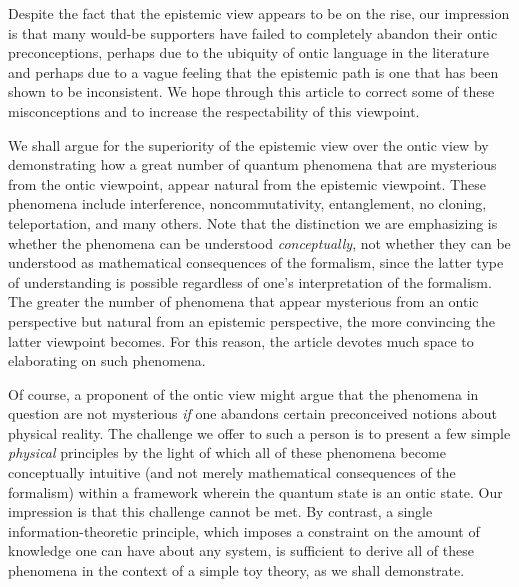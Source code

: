\documentclass[pra,twocolumn,nofootinbib,showpacs]{revtex4}
\begin{document}
Despite the fact that the epistemic view appears to be on the rise, our
impression is that many would-be supporters have failed to completely
abandon their ontic preconceptions, perhaps due to the ubiquity of ontic
language in the literature and perhaps due to a vague feeling that the
epistemic path is one that has been shown to be inconsistent. We hope
through this article to correct some of these misconceptions and to increase
the respectability of this viewpoint.

We shall argue for the superiority of the epistemic view over the ontic view
by demonstrating how a great number of quantum phenomena that are mysterious
from the ontic viewpoint, appear natural from the epistemic viewpoint. These
phenomena include interference, noncommutativity, entanglement, no cloning,
teleportation, and many others. Note that the distinction we are emphasizing
is whether the phenomena can be understood \emph{conceptually}, not whether
they can be understood as mathematical consequences of the formalism, since
the latter type of understanding is possible regardless of one's
interpretation of the formalism. The greater the number of phenomena that
appear mysterious from an ontic perspective but natural from an epistemic
perspective, the more convincing the latter viewpoint becomes. For this
reason, the article devotes much space to elaborating on such phenomena.

Of course, a proponent of the ontic view might argue that the phenomena in
question are not mysterious \emph{if} one abandons certain preconceived
notions about physical reality. The challenge we offer to such a person is
to present a few simple \emph{physical} principles by the light of which all
of these phenomena become conceptually intuitive (and not merely
mathematical consequences of the formalism) within a framework wherein the
quantum state is an ontic state. Our impression is that this challenge
cannot be met. By contrast, a single information-theoretic principle, which
imposes a constraint on the amount of knowledge one can have about any
system, is sufficient to derive all of these phenomena in the context of a
simple toy theory, as we shall demonstrate.
\end{document}
